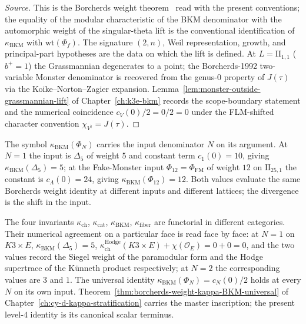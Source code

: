 \begin{proof}[Source]
This is the Borcherds weight theorem~\cite[Theorem~13.3,
\S~14]{Borcherds1998} read with the present conventions; the
equality of the modular characteristic of the BKM denominator with
the automorphic weight of the singular-theta lift is the conventional
identification of \(\kappa_{\mathrm{BKM}}\) with
\(\mathrm{wt}(\Phi_f)\).  The signature \((2,n)\), Weil
representation, growth, and principal-part hypotheses are the data on
which the lift is defined.  At \(L = \mathrm{II}_{1, 1}\)
($b^+ = 1$) the Grassmannian degenerates to a point; the
Borcherds-1992 two-variable Monster denominator
\cite[Theorem~10.1]{Borcherds1992} is recovered from the
genus-$0$ property of $J(\tau)$ via the Koike--Norton--Zagier
expansion.  Lemma~\ref{lem:monster-outside-grassmannian-lift} of
Chapter~\ref{ch:k3e-bkm} records the scope-boundary statement and
the numerical coincidence
$c_V(0)/2 = 0/2 = 0$ under the FLM-shifted character convention
$\chi_{V^\natural} = J(\tau)$.
\end{proof}

\begin{remark}
\label{rem:terminus-subscript-discipline}
The symbol $\kappa_{\mathrm{BKM}}(\Phi_N)$ carries the input
denominator $N$ on its argument.  At $N = 1$ the input is $\Delta_5$
of weight $5$ and constant term $c_1(0) = 10$, giving
$\kappa_{\mathrm{BKM}}(\Delta_5) = 5$; at the Fake-Monster input
$\Phi_{12} = \Phi_{\mathrm{FM}}$ of weight $12$ on
$\mathrm{II}_{25, 1}$ the constant is $c_\Lambda(0) = 24$, giving
$\kappa_{\mathrm{BKM}}(\Phi_{12}) = 12$.  Both values evaluate the
same Borcherds weight identity at different inputs and different
lattices; the divergence is the shift in the input.
\end{remark}

\begin{remark}
\label{rem:terminus-four-kappa-separation}
The four invariants $\kappa_{\mathrm{ch}}$, $\kappa_{\mathrm{cat}}$,
$\kappa_{\mathrm{BKM}}$, $\kappa_{\mathrm{fiber}}$ are functorial in
different categories.  Their numerical agreement on a particular face
is read face by face: at $N = 1$ on $K3 \times E$,
$\kappa_{\mathrm{BKM}}(\Delta_5) = 5$,
$\kappa_{\mathrm{ch}}^{\mathrm{Hodge}}(K3 \times E) +
\chi(\mathcal O_E) = 0 + 0 = 0$, and the two values record the
Siegel weight of the paramodular form and the Hodge supertrace of
the K\"unneth product respectively; at $N = 2$ the corresponding
values are $3$ and $1$.  The universal identity
$\kappa_{\mathrm{BKM}}(\Phi_N) = c_N(0)/2$ holds at every $N$ on its
own input.  Theorem~\ref{thm:borcherds-weight-kappa-BKM-universal}
of Chapter~\ref{ch:cy-d-kappa-stratification} carries the master
inscription; the present level-$4$ identity is its canonical scalar
terminus.
\end{remark}

